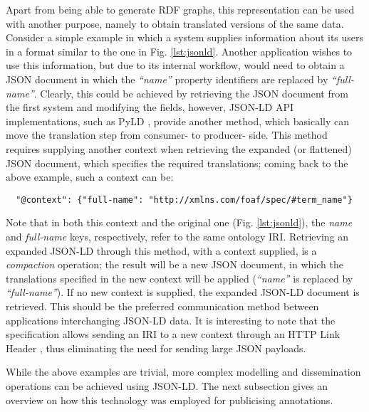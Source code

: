 Apart from being able to generate RDF graphs, this representation can be used
with another purpose, namely to obtain translated versions of the same data.
Consider a simple example in which a system supplies information about its
users in a format similar to the one in Fig. \ref{lst:jsonld}. Another
application wishes to use this information, but due to its internal workflow,
would need to obtain a JSON document in which the \textit{``name''} property
identifiers are replaced by \textit{``full-name''}.  Clearly, this could be
achieved by retrieving the JSON document from the first system and modifying
the fields, however, JSON-LD API implementations, such as PyLD \cite{ref:pyld},
provide another method, which basically can move the translation step from
consumer- to producer- side.  This method requires supplying another context
when retrieving the expanded (or flattened) JSON document, which specifies the
required translations; coming back to the above example, such a context can be:
\begin{verbatim}
  "@context": {"full-name": "http://xmlns.com/foaf/spec/#term_name"}
\end{verbatim}

Note that in both this context and the original one (Fig. \ref{lst:jsonld}),
the \textit{name} and \textit{full-name} keys, respectively, refer to the same
ontology IRI. Retrieving an expanded JSON-LD through this method, with a
context supplied, is a \textit{compaction} operation; the result will be a new
JSON document, in which the translations specified in the new context will be
applied (\textit{``name''} is replaced by \textit{``full-name''}). If no new
context is supplied, the expanded JSON-LD document is retrieved. This should be
the preferred communication method between applications interchanging JSON-LD
data. It is interesting to note that the specification allows sending an IRI to
a new context through an HTTP Link Header \cite{ref:rfc5988}, thus eliminating
the need for sending large JSON payloads.

While the above examples are trivial, more complex modelling and dissemination
operations can be achieved using JSON-LD. The next subsection gives an overview
on how this technology was employed for publicising annotations.
